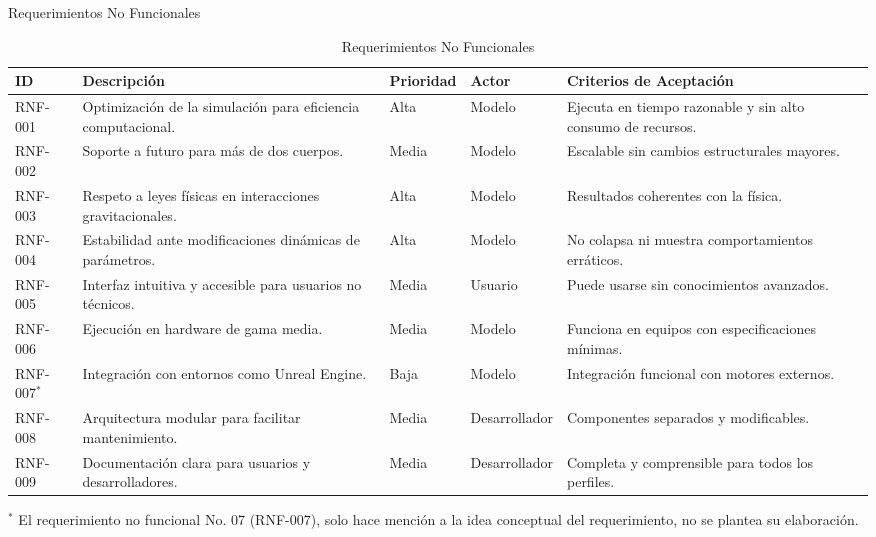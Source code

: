 \begin{frame}{Requerimientos No Funcionales}
  \vspace{-0.4cm}
  \begin{table}[H]
      \centering
      \caption{Requerimientos No Funcionales}
      \vspace{-0.35cm}
      \begin{adjustbox}{max width=1\textwidth, max height=0.4\textheight, keepaspectratio}
      \begin{tabular}{p{1.2cm}p{5cm}p{1.75cm}p{2.25cm}p{5cm}}
      \toprule
      \textbf{ID} & \textbf{Descripción} & \textbf{Prioridad} & \textbf{Actor} & \textbf{Criterios de Aceptación} \\
      \midrule
      RNF-001 & Optimización de la simulación para eficiencia computacional. & Alta & Modelo & Ejecuta en tiempo razonable y sin alto consumo de recursos. \\
      \midrule
      RNF-002 & Soporte a futuro para más de dos cuerpos. & Media & Modelo & Escalable sin cambios estructurales mayores. \\
      \midrule
      RNF-003 & Respeto a leyes físicas en interacciones gravitacionales. & Alta & Modelo & Resultados coherentes con la física. \\
      \midrule
      RNF-004 & Estabilidad ante modificaciones dinámicas de parámetros. & Alta & Modelo & No colapsa ni muestra comportamientos erráticos. \\
      \midrule
      RNF-005 & Interfaz intuitiva y accesible para usuarios no técnicos. & Media & Usuario & Puede usarse sin conocimientos avanzados. \\
      \midrule
      RNF-006 & Ejecución en hardware de gama media. & Media & Modelo & Funciona en equipos con especificaciones mínimas. \\
      \midrule
      RNF-007$^{*}$ & Integración con entornos como Unreal Engine. & Baja & Modelo & Integración funcional con motores externos. \\
      \midrule
      RNF-008 & Arquitectura modular para facilitar mantenimiento. & Media & Desarrollador & Componentes separados y modificables. \\
      \midrule
      RNF-009 & Documentación clara para usuarios y desarrolladores. & Media & Desarrollador & Completa y comprensible para todos los perfiles. \\
      \bottomrule
      \end{tabular}
      \vspace{0.5em}
      \end{adjustbox}
      \begin{minipage}{\textwidth}
    \footnotesize{\tiny $^{*}$ El requerimiento no funcional No. 07 (RNF-007), solo hace mención a la idea conceptual del requerimiento, no se plantea su elaboración.}
    \end{minipage}
  \end{table}

\end{frame}


